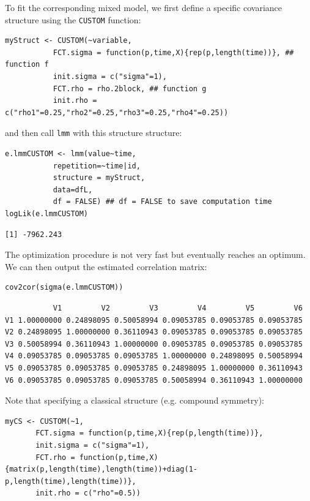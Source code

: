 \documentclass[12pt]{article}
\begin{document}
To fit the corresponding mixed model, we first define a specific
covariance structure using the \texttt{CUSTOM} function:
\lstset{language=r,label= ,caption= ,captionpos=b,numbers=none}
\begin{lstlisting}
myStruct <- CUSTOM(~variable,
		   FCT.sigma = function(p,time,X){rep(p,length(time))}, ## function f
		   init.sigma = c("sigma"=1),
		   FCT.rho = rho.2block, ## function g
		   init.rho = c("rho1"=0.25,"rho2"=0.25,"rho3"=0.25,"rho4"=0.25))
\end{lstlisting}

and then call \texttt{lmm} with this structure structure:
\lstset{language=r,label= ,caption= ,captionpos=b,numbers=none}
\begin{lstlisting}
e.lmmCUSTOM <- lmm(value~time,
		   repetition=~time|id,
		   structure = myStruct,
		   data=dfL,
		   df = FALSE) ## df = FALSE to save computation time
logLik(e.lmmCUSTOM)
\end{lstlisting}

\begin{verbatim}
[1] -7962.243
\end{verbatim}


The optimization procedure is not very fast but eventually reaches an
optimum. We can then output the estimated correlation matrix:
\lstset{language=r,label= ,caption= ,captionpos=b,numbers=none}
\begin{lstlisting}
cov2cor(sigma(e.lmmCUSTOM))
\end{lstlisting}

\begin{verbatim}
           V1         V2         V3         V4         V5         V6
V1 1.00000000 0.24898095 0.50058994 0.09053785 0.09053785 0.09053785
V2 0.24898095 1.00000000 0.36110943 0.09053785 0.09053785 0.09053785
V3 0.50058994 0.36110943 1.00000000 0.09053785 0.09053785 0.09053785
V4 0.09053785 0.09053785 0.09053785 1.00000000 0.24898095 0.50058994
V5 0.09053785 0.09053785 0.09053785 0.24898095 1.00000000 0.36110943
V6 0.09053785 0.09053785 0.09053785 0.50058994 0.36110943 1.00000000
\end{verbatim}


\clearpage

Note that specifying a classical structure (e.g. compound symmetry):
\lstset{language=r,label= ,caption= ,captionpos=b,numbers=none}
\begin{lstlisting}
myCS <- CUSTOM(~1,
       FCT.sigma = function(p,time,X){rep(p,length(time))},
       init.sigma = c("sigma"=1),
       FCT.rho = function(p,time,X){matrix(p,length(time),length(time))+diag(1-p,length(time),length(time))},
       init.rho = c("rho"=0.5))
\end{lstlisting}
\end{document}
